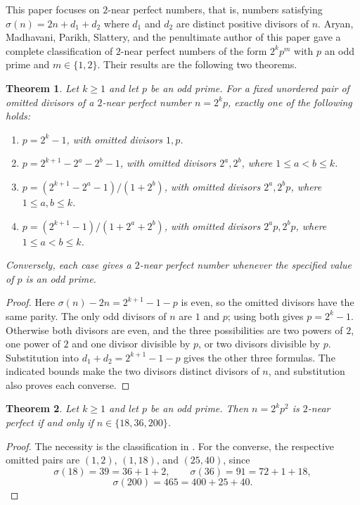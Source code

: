 \documentclass[10pt]{article}
\newtheorem{theorem}{Theorem}
\theoremstyle{definition}
\begin{document}
This paper focuses on $2$-near perfect numbers, that is, numbers satisfying $\sigma(n) = 2n + d_1 + d_2$ where $d_1$ and $d_2$ are distinct positive divisors of $n$. Aryan, Madhavani, Parikh, Slattery, and the penultimate author of this paper \cite{AMPSZ} gave a complete classification of $2$-near perfect numbers of the form $2^k p^m$ with $p$ an odd prime and $m \in \{1,2\}$. Their results are the following two theorems.
\begin{theorem}\label{classification of 2 near perfect of form power of two times a prime}
Let $k\ge1$ and let $p$ be an odd prime. For a fixed unordered pair of
omitted divisors of a $2$-near perfect number $n=2^kp$, exactly one of
the following holds:
\begin{enumerate}
\item $p=2^k-1$, with omitted divisors $1,p$.
\item $p=2^{k+1}-2^a-2^b-1$, with omitted divisors $2^a,2^b$,
      where $1\le a<b\le k$.
\item $p=(2^{k+1}-2^a-1)/(1+2^b)$, with omitted divisors
      $2^a,2^bp$, where $1\le a,b\le k$.
\item $p=(2^{k+1}-1)/(1+2^a+2^b)$, with omitted divisors
      $2^ap,2^bp$, where $1\le a<b\le k$.
\end{enumerate}
Conversely, each case gives a $2$-near perfect number whenever the
specified value of $p$ is an odd prime.
\end{theorem}

\begin{proof}
Here $\sigma(n)-2n=2^{k+1}-1-p$ is even, so the omitted divisors
have the same parity. The only odd divisors of $n$ are $1$ and $p$;
using both gives $p=2^k-1$. Otherwise both divisors are even, and
the three possibilities are two powers of $2$, one power of $2$
and one divisor divisible by $p$, or two divisors divisible by $p$.
Substitution into $d_1+d_2=2^{k+1}-1-p$ gives the other three formulas.
The indicated bounds make the two divisors distinct divisors of $n$,
and substitution also proves each converse.
\end{proof}

\begin{theorem}\label{2 near of form power of two times prime squared}
Let $k\ge1$ and let $p$ be an odd prime. Then $n=2^kp^2$ is
$2$-near perfect if and only if $n\in\{18,36,200\}$.
\end{theorem}
\begin{proof}
The necessity is the classification in \cite{AMPSZ}.
For the converse, the respective omitted pairs are $(1,2)$,
$(1,18)$, and $(25,40)$, since
\[
\sigma(18)=39=36+1+2,\qquad
\sigma(36)=91=72+1+18,
\]
\[
\sigma(200)=465=400+25+40.
\]
\end{proof}
\end{document}
